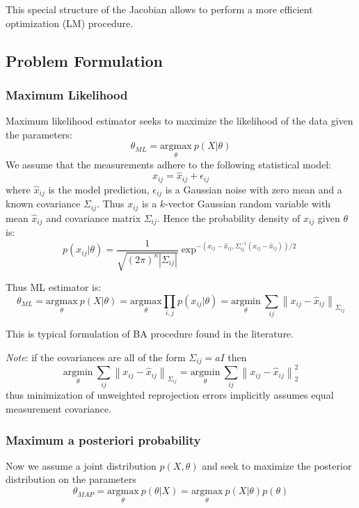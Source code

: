\documentclass[10pt]{article}         %
\begin{document}
This special structure of the Jacobian allows to perform a more
efficient optimization (LM) procedure.

\subsection{Problem Formulation}

\subsubsection{Maximum Likelihood}

Maximum likelihood estimator seeks to maximize the likelihood of the
data given the parameters:
\[
\theta_{ML} = \underset{\theta}{\text{argmax}}\ p(X|\theta)
\]
We assume that the measurements adhere to the following statistical
model:
\[
x_{ij} = \hat{x}_{ij}+\epsilon_{ij}
\]
where $\hat{x}_{ij}$ is the model prediction, $\epsilon_{ij}$ is a
Gaussian noise with zero mean and a known covariance
$\Sigma_{ij}$. Thus $x_{ij}$ is a $k$-vector Gaussian random variable
with mean $\hat{x}_{ij}$ and covariance matrix $\Sigma_{ij}$. Hence
the probability density of $x_{ij}$ given $\theta$ is:
\[
p(x_{ij}|\theta)=\frac{1}{\sqrt{(2\pi)^n\left|\Sigma_{ij}\right|}}\exp^{-(x_{ij}-\hat{x}_{ij},\Sigma_{ij}^{-1}(x_{ij}-\hat{x}_{ij}))/2}
\]

Thus ML estimator is:
\[
\theta_{ML} = \underset{\theta}{\text{argmax}}\ p(X|\theta) =
\underset{\theta}{\text{argmax}} \prod_{i,j} p(x_{ij}|\theta)
=\underset{\theta}{\text{argmin}}\ \sum_{ij}\left\| x_{ij}-\hat{x}_{ij}\right\|_{\Sigma_{ij}}
\]

This is typical formulation of BA procedure found in the
literature. 

\emph{Note}: if the covariances are all of the form $\Sigma_{ij}=a I$
then
\[
\underset{\theta}{\text{argmin}}\ \sum_{ij}\left\|
  x_{ij}-\hat{x}_{ij}\right\|_{\Sigma_{ij}} = \underset{\theta}{\text{argmin}}\ \sum_{ij}\left\|
  x_{ij}-\hat{x}_{ij}\right\|_2^2
\]
thus minimization of unweighted reprojection errors implicitly assumes
equal measurement covariance.

\subsubsection{Maximum a posteriori probability}

Now we assume a joint distribution $p(X,\theta)$ and seek to maximize
the posterior distribution on the parameters
\[
\theta_{MAP} = \underset{\theta}{\text{argmax}}\ p(\theta|X)= \underset{\theta}{\text{argmax}}\ p(X|\theta)p(\theta)
\]
\end{document}
